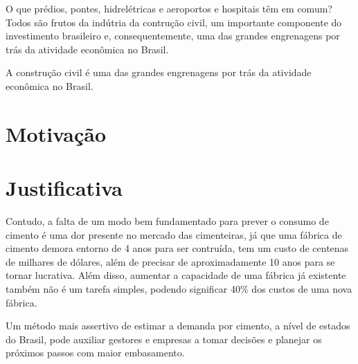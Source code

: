 

\label{cap:introducao}

\enlargethispage{.5\baselineskip}

O que prédios, pontes, hidrelétricas e aeroportos e hospitais têm em comum? Todos são frutos da indútria da contrução civil, um importante componente do investimento brasileiro e, consequentemente, uma das grandes engrenagens por trás da atividade econômica no Brasil.

A construção civil é uma das grandes engrenagens por trás da atividade econômica no Brasil.

\section*{Motivação}


\section*{Justificativa}

Contudo, a falta de um modo bem fundamentado para prever o consumo de cimento é uma dor presente no mercado das cimenteiras, já que uma fábrica de cimento demora entorno de 4 anos para ser contruída, tem um custo de centenas de milhares de dólares, além de precisar de aproximadamente 10 anos para se tornar lucrativa. Além disso, aumentar a capacidade de uma fábrica já existente também não é um tarefa simples, podendo significar 40\% dos custos de uma nova fábrica.

Um método mais assertivo de estimar a demanda por cimento, a nível de estados do Brasil, pode auxiliar gestores e empresas a tomar decisões e planejar os próximos passos com maior embasamento.

